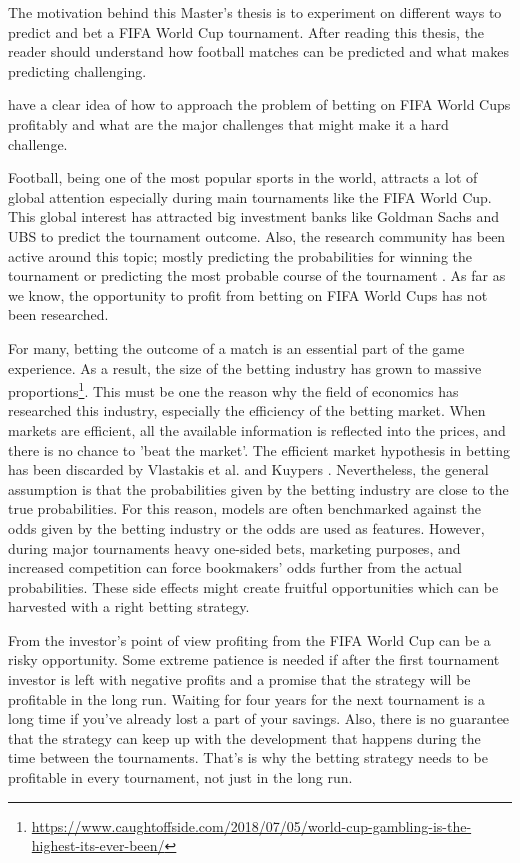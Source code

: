 

The motivation behind this Master's thesis is to experiment on different ways to predict and bet a FIFA World Cup tournament. After reading this thesis, the reader should understand how football matches can be predicted and what makes predicting challenging.

have a clear idea of how to approach the problem of betting on FIFA World Cups profitably and what are the major challenges that might make it a hard challenge.

Football, being one of the most popular sports in the world, attracts a lot of global attention especially during main tournaments like the FIFA World Cup. This global interest has attracted big investment banks like Goldman Sachs and UBS to predict the tournament outcome. Also, the research community has been active around this topic; mostly predicting the probabilities for winning the tournament or predicting the most probable course of the tournament \cite{groll2018prediction, groll2015prediction, leitner2010forecasting}. As far as we know, the opportunity to profit from betting on FIFA World Cups has not been researched.

For many, betting the outcome of a match is an essential part of the game experience. As a result, the size of the betting industry has grown to massive proportions\footnote{\url{https://www.caughtoffside.com/2018/07/05/world-cup-gambling-is-the-highest-its-ever-been/}}. This must be one the reason why the field of economics has researched this industry, especially the efficiency of the betting market. When markets are efficient, all the available information is reflected into the prices, and there is no chance to 'beat the market'. The efficient market hypothesis in betting has been discarded by Vlastakis et al. \cite{vlastakis2009efficient} and Kuypers \cite{kuypers2008}. Nevertheless, the general assumption is that the probabilities given by the betting industry are close to the true probabilities. For this reason, models are often benchmarked against the odds given by the betting industry or the odds are used as features. \cite{leitner2010forecasting} However, during major tournaments heavy one-sided bets, marketing purposes, and increased competition can force bookmakers' odds further from the actual probabilities. These side effects might create fruitful opportunities which can be harvested with a right betting strategy.

From the investor's point of view profiting from the FIFA World Cup can be a risky opportunity. Some extreme patience is needed if after the first tournament investor is left with negative profits and a promise that the strategy will be profitable in the long run. Waiting for four years for the next tournament is a long time if you've already lost a part of your savings. Also, there is no guarantee that the strategy can keep up with the development that happens during the time between the tournaments. That's is why the betting strategy needs to be profitable in every tournament, not just in the long run.

